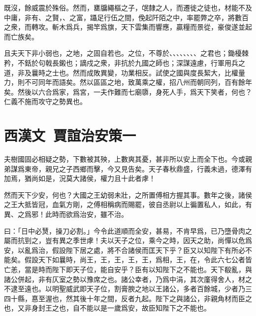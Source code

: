 既沒，餘威震於殊俗。然而，罋牖繩樞之子，氓隸之人，而遷徙之徒也，材能不及中庸，非有、之賢，、之富，躡足行伍之間，俛起阡陌之中，率罷弊之卒，將數百之衆，而轉攻。斬木爲兵，揭竿爲旗，天下雲集而響應，贏糧而景從，豪俊遂並起而亡族矣。

且夫天下非小弱也，之地，之固自若也。之位，不尊於、、、、、、、、之君也；鋤櫌棘矜，不銛於句戟長鎩也；謫戍之衆，非抗於九國之師也；深謀遠慮，行軍用兵之道，非及曩時之士也。然而成敗異變，功業相反。試使之國與度長絜大，比權量力，則不可同年而語矣。然以區區之地，致萬乘之權，招八州而朝同列，百有餘年矣。然後以六合爲家，爲宮，一夫作難而七廟隳，身死人手，爲天下笑者，何也？仁義不施而攻守之勢異也。

\section[賈誼治安策一\quad{\small 西漢文}]{{\normalsize 西漢文\ 賈誼}\quad 治安策一}
夫樹國固必相疑之勢，下數被其殃，上數爽其憂，甚非所以安上而全下也。今或親弟謀爲東帝，親兄之子西鄉而擊，今又見告矣。天子春秋鼎盛，行義未過，德澤有加焉，猶尚如是，況莫大諸侯，權力且十此者虖！

然而天下少安，何也？大國之王幼弱未壯，之所置傅相方握其事。數年之後，諸侯之王大抵皆冠，血氣方剛，之傅相稱病而賜罷，彼自丞尉以上徧置私人，如此，有異、之爲邪！此時而欲爲治安，雖不治。

曰：「日中必熭，操刀必割。」今令此道順而全安，甚易，不肯早爲，已乃墮骨肉之屬而抗剄之，豈有異之季世虖！夫以天子之位，乘今之時，因天之助，尚憚以危爲安，以亂爲治，假設陛下居之處，將不合諸侯而匡天下乎？臣又以知陛下有所必不能矣。假設天下如曩時，尚王，王，王，王，王，爲相，王，在，令此六七公者皆亡恙，當是時而陛下即天子位，能自安乎？臣有以知陛下之不能也。天下殽亂，與諸公併起，非有仄室之勢以豫席之也。諸公幸者，乃爲中涓，其次廑得舍人，材之不逮至遠也。以明聖威武即天子位，割膏腴之地以王諸公，多者百餘城，少者乃三四十縣，惪至渥也，然其後十年之間，反者九起。陛下之與諸公，非親角材而臣之也，又非身封王之也，自不能以是一歲爲安，故臣知陛下之不能也。

